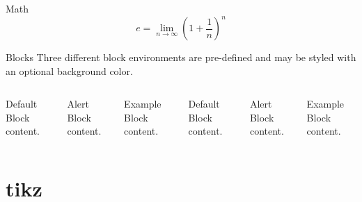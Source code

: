 \begin{frame}{Math}
  \begin{equation*}
    e = \lim_{n\to \infty} \left(1 + \frac{1}{n} \right)^n
  \end{equation*}
\end{frame}

\begin{frame}{Blocks}
  Three different block environments are pre-defined and may be styled with an
  optional background color.

  \begin{columns}[T,onlytextwidth]
      \begin{block}{Default}
        Block content.
      \end{block}

      \begin{alertblock}{Alert}
        Block content.
      \end{alertblock}

      \begin{exampleblock}{Example}
        Block content.
      \end{exampleblock}



      \begin{block}{Default}
        Block content.
      \end{block}

      \begin{alertblock}{Alert}
        Block content.
      \end{alertblock}

      \begin{exampleblock}{Example}
        Block content.
      \end{exampleblock}

  \end{columns}
\end{frame}

\section{tikz}


